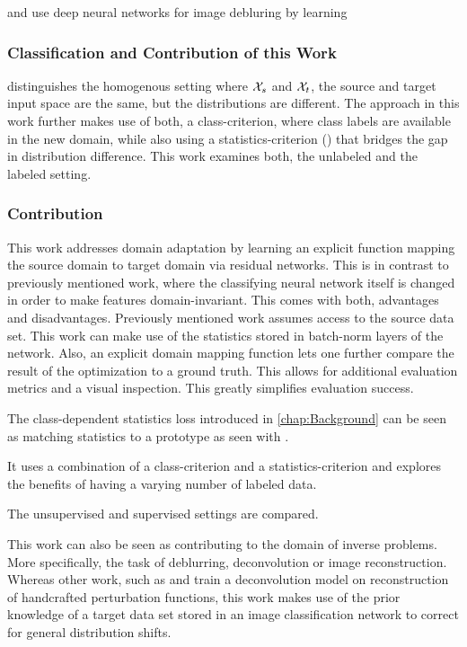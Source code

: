 \cite{IP_Deconv} and \cite{IP_VN} use deep neural networks for image debluring by learning



\subsubsection{Classification and Contribution of this Work}

\cite{DA_SURVEY} distinguishes the homogenous setting 
where $\mathcal X_s$ and $\mathcal X_t$, the source and target input space are the same,
but the distributions are different.
The approach in this work further makes use of both, 
a class-criterion,
where class labels are available in the new domain, while also using a 
statistics-criterion (\cite{DA_SURVEY}) that bridges the gap in distribution difference.
This work examines both, the unlabeled and the labeled setting.

\subsubsection{Contribution}

This work addresses domain adaptation by learning an explicit function mapping the 
source domain to target domain via residual networks.
This is in contrast to previously mentioned work, 
where the classifying neural network itself is changed 
in order to make features domain-invariant.
This comes with both, advantages and disadvantages.
Previously mentioned work assumes access to the source data set.
This work can make use of the statistics stored in batch-norm layers of the network.
Also, an explicit domain mapping function lets one further compare 
the result of the optimization to a ground truth.
This allows for additional evaluation metrics and a visual inspection.
This greatly simplifies evaluation success.

The class-dependent statistics loss introduced in \cref{chap:Background} can be seen as
matching statistics to a prototype as seen with \cite{DA_Prototypes}.

It uses a combination of a class-criterion and a statistics-criterion and 
explores the benefits of having a varying number of labeled data.

The unsupervised and supervised settings are compared.

This work can also be seen as contributing to the domain of inverse problems.
More specifically, the task of deblurring, deconvolution or image reconstruction.
Whereas other work, such as \cite{IP_Deconv} and \cite{IP_VN} train a deconvolution model on
reconstruction of handcrafted perturbation functions, 
this work makes use of the prior knowledge of a target data set
stored in an image classification network to correct for general distribution shifts.

